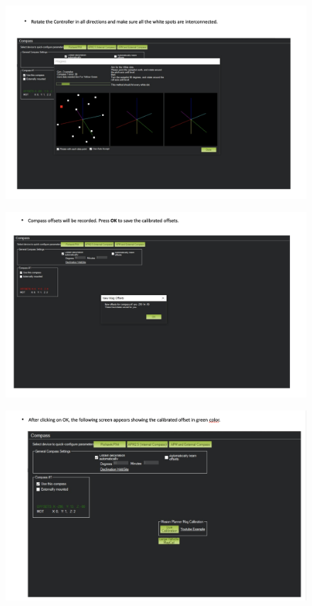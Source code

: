 \begin{figure}[h!]
\centering
\includegraphics[width=\columnwidth]{./Figures/config_img31.png}
\end{figure}

\begin{figure}[h!]
\centering
\includegraphics[width=\columnwidth]{./Figures/config_img32.png}
\end{figure}

\begin{figure}[h!]
\centering
\includegraphics[width=\columnwidth]{./Figures/config_img33.png}
\end{figure}

